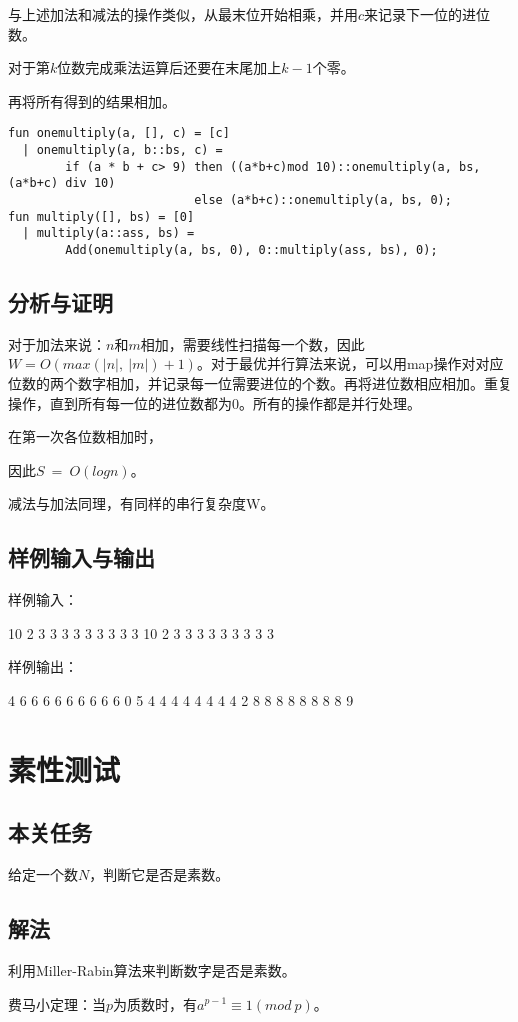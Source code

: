 \documentclass[UTF8,a4paperdui, %
]{ctexart}
\begin{document}
与上述加法和减法的操作类似，从最末位开始相乘，并用$c$来记录下一位的进位数。

对于第$k$位数完成乘法运算后还要在末尾加上$k-1$个零。

再将所有得到的结果相加。

\begin{lstlisting}
fun onemultiply(a, [], c) = [c]
  | onemultiply(a, b::bs, c) = 
        if (a * b + c> 9) then ((a*b+c)mod 10)::onemultiply(a, bs, (a*b+c) div 10)
                          else (a*b+c)::onemultiply(a, bs, 0);
fun multiply([], bs) = [0]
  | multiply(a::ass, bs) = 
        Add(onemultiply(a, bs, 0), 0::multiply(ass, bs), 0);
\end{lstlisting}


\subsection{分析与证明}
对于加法来说：$n$和$m$相加，需要线性扫描每一个数，因此$W=O(max(|n|,\ |m|)+1)$。对于最优并行算法来说，可以用map操作对对应位数的两个数字相加，并记录每一位需要进位的个数。再将进位数相应相加。重复操作，直到所有每一位的进位数都为0。所有的操作都是并行处理。

在第一次各位数相加时，

因此$S\ =\ O(logn)$。

减法与加法同理，有同样的串行复杂度W。
\subsection{样例输入与输出}
样例输入：

10 2 3 3 3 3 3 3 3 3 3 10 2 3 3 3 3 3 3 3 3 3

样例输出：

4 6 6 6 6 6 6 6 6 6 
0 
5 4 4 4 4 4 4 4 4 2 8 8 8 8 8 8 8 8 9 
\section{素性测试}
\subsection{本关任务}
给定一个数$N$，判断它是否是素数。
\subsection{解法}
利用Miller-Rabin算法来判断数字是否是素数。

费马小定理：当$p$为质数时，有$a^{p-1}\equiv 1(mod\ p)$。
\end{document}
